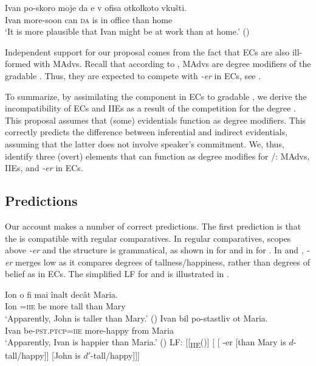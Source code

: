 \documentclass[output=paper,colorlinks,citecolor=brown,newtxmath]{langsci/langscibook}
\begin{document}
	\ea \gll Ivan po-skoro moje da e 	v	ofisa	otkolkoto vkušti.  \\
Ivan	more-soon	can \textsc{da} is 	in	office	than home \\
        \glt `It is more plausible that Ivan might be at work than at home.' \hfill () \label{mightbul}
        \z

\noindent Independent support for our proposal comes from the fact that ECs are also ill-formed with MAdvs. Recall that according to \citet{grewol17}, MAdvs are degree modifiers of the gradable . Thus, they are expected to compete with \textit{-er} in ECs, see .

   \label{rompblec}
    \z

\noindent To summarize, by assimilating the  component in ECs to gradable  \citep{grewol17}, we derive the incompatibility of ECs and IIEs as a result of the competition for the degree . This proposal assumes that (some) evidentials function as degree modifiers. This correctly predicts the difference between inferential and  indirect evidentials, assuming that the latter does not involve speaker's commitment. We, thus, identify three (overt) elements that can function as degree modifies for /: MAdvs, IIEs, and \textit{-er} in ECs.


\subsection{Predictions}\label{sec:predictions}
 Our account makes a number of correct predictions. The first prediction is that the  is compatible with regular comparatives. In regular comparatives,  scopes above \textit{-er} and the structure is grammatical, as  shown in  for  and in  for . In  and , \textit{-er} merges low as it compares degrees of tallness/happiness, rather than degrees of belief as in ECs. The simplified LF for   and  is illustrated in .

	\ea \ea \gll Ion  o 		fi 		mai	\^inalt 	decât	Maria. \\
		Ion \textsc{=iie}	be more	tall than Mary \\
		\glt `Apparently, John is taller than Mary.' \hfill () \label{lowera}
    	\ex \gll Ivan bil po-stastliv ot Maria. \\
 		Ivan be-\textsc{pst.ptcp=iie} more-happy from Maria \\
		\glt `Apparently, Ivan is happier than Maria.' \hfill () \label{lowerb}
    	\ex LF: [[\textsubscript{IIE}()] [ [ -er [than Mary is $d$-tall/happy]] [John is $d'$-tall/happy]]] \label{lowerc}
        \z \z
\end{document}
